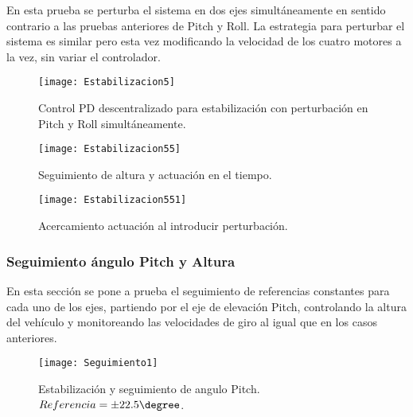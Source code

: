 \documentclass[\main/main.tex]{subfiles}
\begin{document}
En esta prueba se perturba el sistema en dos ejes simultáneamente
en sentido contrario a las pruebas anteriores de Pitch y Roll. La
estrategia para perturbar el sistema es similar pero esta vez modificando
la velocidad de los cuatro motores a la vez, sin variar el controlador.

\begin{figure}[H]
\noindent \begin{centering}
\texttt{[image: Estabilizacion5]}
\par\end{centering}
\caption{Control PD descentralizado para estabilización con perturbación en
Pitch y Roll simultáneamente.}
\end{figure}


\begin{figure}[H]
\noindent \begin{centering}
\texttt{[image: Estabilizacion55]}
\par\end{centering}
\caption{Seguimiento de altura y actuación en el tiempo.}
\end{figure}

\begin{figure}[H]
\noindent \begin{centering}
\texttt{[image: Estabilizacion551]}
\par\end{centering}
\caption{Acercamiento actuación al introducir perturbación.}
\end{figure}

\subsubsection{Seguimiento ángulo Pitch y Altura}

En esta sección se pone a prueba el seguimiento de referencias constantes
para cada uno de los ejes, partiendo por el eje de elevación Pitch,
controlando la altura del vehículo y monitoreando las velocidades
de giro al igual que en los casos anteriores.

\begin{figure}[H]
\noindent \begin{centering}
\texttt{[image: Seguimiento1]}
\par\end{centering}
\caption{Estabilización y seguimiento de angulo Pitch. $Referencia=\pm22.5\degree$.}
\end{figure}
\end{document}

